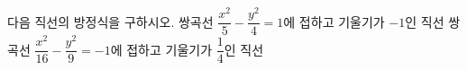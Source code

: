 다음 직선의 방정식을 구하시오.
 쌍곡선 $\dfrac{x^2}{5}-\dfrac{y^2}{4}=1$에 접하고 기울기가 $-1$인 직선
 쌍곡선 $\dfrac{x^2}{16}-\dfrac{y^2}{9}=-1$에 접하고 기울기가 $\dfrac{1}{4}$인 직선
